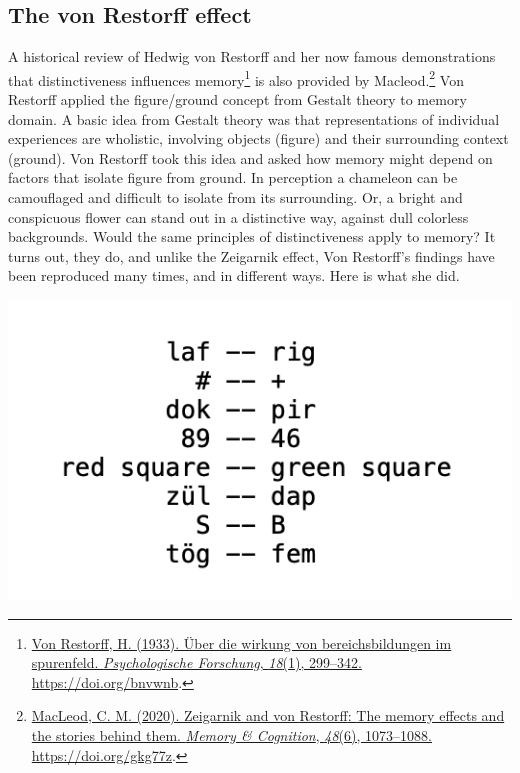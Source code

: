 \documentclass[
  oneside,
  12pt]{crumpbook}
\newenvironment{floatright50}{%
  \wrapfigure{R}{.5\textwidth}%
  }{%
  \endwrapfigure}
\begin{document}
\hypertarget{the-von-restorff-effect}{%
\subsection{The von Restorff effect}\label{the-von-restorff-effect}}

A historical review of Hedwig von Restorff and her now famous demonstrations that distinctiveness influences memory\footnote{\protect\hyperlink{ref-vonrestorffUberWirkungBereichsbildungen1933}{Von Restorff, H. (1933). Über die wirkung von bereichsbildungen im spurenfeld. \emph{Psychologische Forschung}, \emph{18}(1), 299--342. \url{https://doi.org/bnvwnb}}.} is also provided by Macleod.\footnote{\protect\hyperlink{ref-macleodZeigarnikRestorffMemory2020}{MacLeod, C. M. (2020). Zeigarnik and von {Restorff}: {The} memory effects and the stories behind them. \emph{Memory \& Cognition}, \emph{48}(6), 1073--1088. \url{https://doi.org/gkg77z}}.} Von Restorff applied the figure/ground concept from Gestalt theory to memory domain. A basic idea from Gestalt theory was that representations of individual experiences are wholistic, involving objects (figure) and their surrounding context (ground). Von Restorff took this idea and asked how memory might depend on factors that isolate figure from ground. In perception a chameleon can be camouflaged and difficult to isolate from its surrounding. Or, a bright and conspicuous flower can stand out in a distinctive way, against dull colorless backgrounds. Would the same principles of distinctiveness apply to memory? It turns out, they do, and unlike the Zeigarnik effect, Von Restorff's findings have been reproduced many times, and in different ways. Here is what she did.

\begin{floatright50}
\includegraphics[width=1\linewidth]{imgs/Von_restorff_Stimuli}

\end{floatright50}
\end{document}
